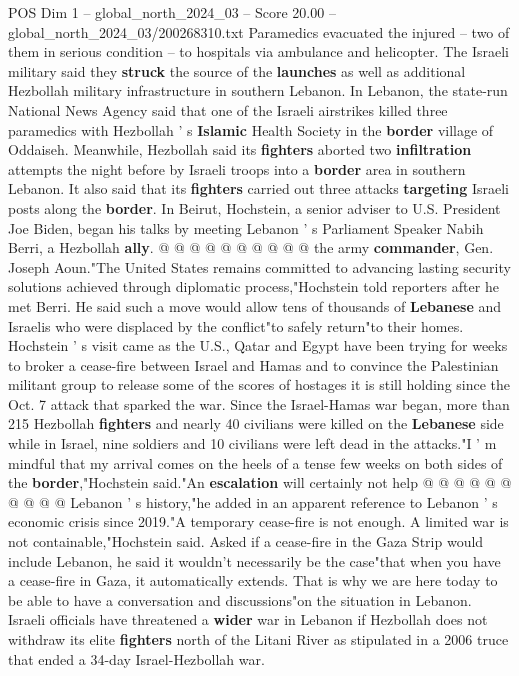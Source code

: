 \begin{textsample}{POS Dim 1 – global\_north\_2024\_03 – Score 20.00 – global\_north\_2024\_03/200268310.txt}
Paramedics evacuated the injured -- two of them in serious condition -- to hospitals via ambulance and helicopter.
The Israeli military said they \textbf{struck} the source of the \textbf{launches} as well as additional Hezbollah military infrastructure in southern Lebanon.
In Lebanon, the state-run National News Agency said that one of the Israeli airstrikes killed three paramedics with Hezbollah ' s \textbf{Islamic} Health Society in the \textbf{border} village of Oddaiseh.
Meanwhile, Hezbollah said its \textbf{fighters} aborted two \textbf{infiltration} attempts the night before by Israeli troops into a \textbf{border} area in southern Lebanon.
It also said that its \textbf{fighters} carried out three attacks \textbf{targeting} Israeli posts along the \textbf{border}.
In Beirut, Hochstein, a senior adviser to U.S.
President Joe Biden, began his talks by meeting Lebanon ' s Parliament Speaker Nabih Berri, a Hezbollah \textbf{ally}. @ @ @ @ @ @ @ @ @ @ the army \textbf{commander}, Gen.
Joseph Aoun."The United States remains committed to advancing lasting security solutions achieved through diplomatic process,"Hochstein told reporters after he met Berri.
He said such a move would allow tens of thousands of \textbf{Lebanese} and Israelis who were displaced by the conflict"to safely return"to their homes.
Hochstein ' s visit came as the U.S., Qatar and Egypt have been trying for weeks to broker a cease-fire between Israel and Hamas and to convince the Palestinian militant group to release some of the scores of hostages it is still holding since the Oct. 7 attack that sparked the war.
Since the Israel-Hamas war began, more than 215 Hezbollah \textbf{fighters} and nearly 40 civilians were killed on the \textbf{Lebanese} side while in Israel, nine soldiers and 10 civilians were left dead in the attacks."I ' m mindful that my arrival comes on the heels of a tense few weeks on both sides of the \textbf{border},"Hochstein said."An \textbf{escalation} will certainly not help @ @ @ @ @ @ @ @ @ @ Lebanon ' s history,"he added in an apparent reference to Lebanon ' s economic crisis since 2019."A temporary cease-fire is not enough.
A limited war is not containable,"Hochstein said.
Asked if a cease-fire in the Gaza Strip would include Lebanon, he said it wouldn't necessarily be the case"that when you have a cease-fire in Gaza, it automatically extends.
That is why we are here today to be able to have a conversation and discussions"on the situation in Lebanon.
Israeli officials have threatened a \textbf{wider} war in Lebanon if Hezbollah does not withdraw its elite \textbf{fighters} north of the Litani River as stipulated in a 2006 truce that ended a 34-day Israel-Hezbollah war.

\end{textsample}
